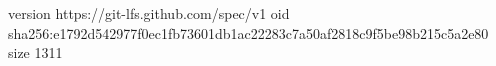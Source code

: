 version https://git-lfs.github.com/spec/v1
oid sha256:e1792d542977f0ec1fb73601db1ac22283c7a50af2818c9f5be98b215c5a2e80
size 1311
